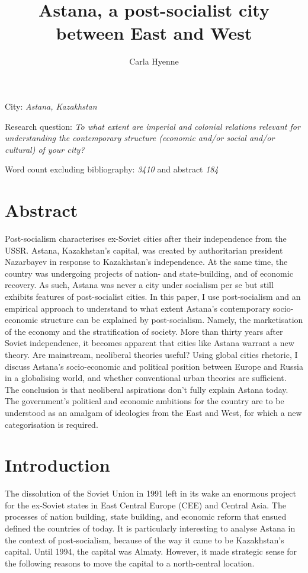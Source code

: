 \documentclass{article}
\title{Astana, a post-socialist city between East and West}
\author{Carla Hyenne}
\date{}
\begin{document}
\maketitle 

City: \textit{Astana, Kazakhstan}

Research question: \textit{To what extent are imperial and colonial relations relevant for understanding the contemporary structure (economic and/or social and/or cultural) of your city?}

Word count excluding bibliography: \textit{3410} and abstract \textit{184} 

\section{Abstract}

Post-socialism characterises ex-Soviet cities after their independence from the USSR.
Astana, Kazakhstan's capital, was created by authoritarian president Nazarbayev in response to Kazakhstan's independence. At the same time, the country was undergoing projects of nation- and state-building, and of economic recovery. As such, Astana was never a city under socialism per se but still exhibits features of post-socialist cities. In this paper, I use post-socialism and an empirical approach to understand to what extent Astana's contemporary socio-economic structure can be explained by post-socialism. 
Namely, the marketisation of the economy and the stratification of society.
More than thirty years after Soviet independence, it becomes apparent that cities like Astana warrant a new theory. 
Are mainstream, neoliberal theories useful? Using global cities rhetoric, I discuss Astana's socio-economic and political position between Europe and Russia in a globalising world, and whether conventional urban theories are sufficient. 
The conclusion is that neoliberal aspirations don't fully explain Astana today. The government's political and economic ambitions for the country are to be understood as an amalgam of ideologies from the East and West, for which a new categorisation is required.

\pagebreak

\section{Introduction} 

The dissolution of the Soviet Union in 1991 left in its wake an enormous project for the ex-Soviet states in East Central Europe (CEE) and Central Asia. The processes of nation building, state building, and economic reform that ensued defined the countries of today. It is particularly interesting to analyse Astana in the context of post-socialism, because of the way it came to be Kazakhstan's capital. 
Until 1994, the capital was Almaty. However, it made strategic sense for the following reasons to move the capital to a north-central location. 
\end{document}
